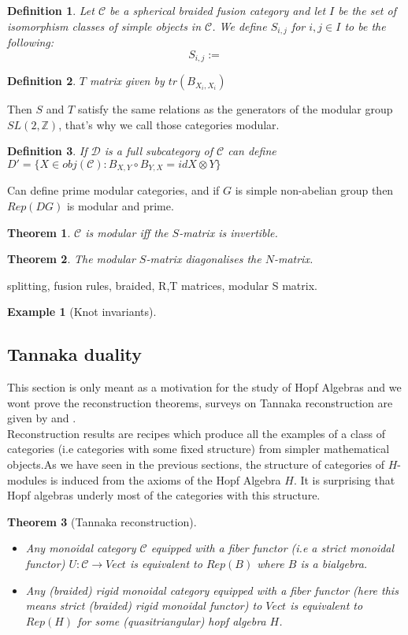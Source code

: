 \documentclass{article}
\newtheorem{definition}{Definition}
\newtheorem{example}{Example}
\newtheorem{theorem}{Theorem}
\newcommand{\cat}{\mathcal{C}}
\begin{document}
\begin{definition}
	Let $\mathcal{C}$ be a spherical braided fusion category and let $I$ be the set of isomorphism classes of simple objects in $\mathcal{C}$. We define $S_{i,j}$ for $i,j \in I$ to be the following:
	\begin{equation}
		S_{i,j} := 
	\end{equation}
\end{definition} 
\begin{definition}
	$T$ matrix given by $tr(B_{X_i,X_i})$
\end{definition}
Then $S$ and $T$ satisfy the same relations as the generators of the modular group $SL(2,\mathbb{Z})$, that's why we call those categories modular.
\begin{definition}
	If $\mathcal{D}$ is a full subcategory of $\mathcal{C}$ can define $D'=\{X \in obj(\mathcal{C}): B_{X,Y} \circ B_{Y,X} = id{X \otimes Y}\}$
\end{definition}
Can define prime modular categories, and if $G$ is simple non-abelian group then $Rep(DG)$ is modular and prime.
\begin{theorem}
	$\mathcal{C}$ is modular iff the $S$-matrix is invertible.
\end{theorem}
\begin{theorem}
	The modular $S$-matrix diagonalises the $N$-matrix.
\end{theorem}
splitting, fusion rules, braided, R,T matrices, modular S matrix.

\begin{example}[Knot invariants]
\end{example}

\subsection{Tannaka duality}
This section is only meant as a motivation for the study of Hopf Algebras and we wont prove the reconstruction theorems, surveys on Tannaka reconstruction are given by \cite{Vercruysse12} and \cite{Joyal91}.\\

Reconstruction results are recipes which produce all the examples of a class of categories (i.e categories with some fixed structure) from simpler mathematical objects.As we have seen in the previous sections, the structure of categories of $H$-modules is induced from the axioms of the Hopf Algebra $H$. It is surprising that Hopf algebras underly most of the categories with this structure.
\begin{theorem}[Tannaka reconstruction]
	\begin{itemize}
		\item Any monoidal category $\cat$ equipped with a fiber functor (i.e a strict monoidal functor) $U: \cat \rightarrow Vect$ is equivalent to $Rep(B)$ where $B$ is a bialgebra.
		\item Any (braided) rigid monoidal category equipped with a fiber functor (here this means strict (braided) rigid monoidal functor) to $Vect$ is equivalent to $Rep(H)$ for some (quasitriangular) hopf algebra $H$.
	\end{itemize}
\end{theorem}
\end{document}
